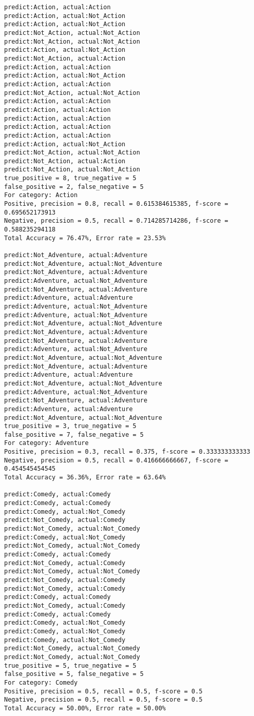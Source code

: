 \documentclass{article}
\begin{document}
\begin{lstlisting}
predict:Action, actual:Action
predict:Action, actual:Not_Action
predict:Action, actual:Not_Action
predict:Not_Action, actual:Not_Action
predict:Not_Action, actual:Not_Action
predict:Action, actual:Not_Action
predict:Not_Action, actual:Action
predict:Action, actual:Action
predict:Action, actual:Not_Action
predict:Action, actual:Action
predict:Not_Action, actual:Not_Action
predict:Action, actual:Action
predict:Action, actual:Action
predict:Action, actual:Action
predict:Action, actual:Action
predict:Action, actual:Action
predict:Action, actual:Not_Action
predict:Not_Action, actual:Not_Action
predict:Not_Action, actual:Action
predict:Not_Action, actual:Not_Action
true_positive = 8, true_negative = 5
false_positive = 2, false_negative = 5
For category: Action
Positive, precision = 0.8, recall = 0.615384615385, f-score = 0.695652173913 
Negative, precision = 0.5, recall = 0.714285714286, f-score = 0.588235294118 
Total Accuracy = 76.47%, Error rate = 23.53%

predict:Not_Adventure, actual:Adventure
predict:Not_Adventure, actual:Not_Adventure
predict:Not_Adventure, actual:Adventure
predict:Adventure, actual:Not_Adventure
predict:Not_Adventure, actual:Adventure
predict:Adventure, actual:Adventure
predict:Adventure, actual:Not_Adventure
predict:Adventure, actual:Not_Adventure
predict:Not_Adventure, actual:Not_Adventure
predict:Not_Adventure, actual:Adventure
predict:Not_Adventure, actual:Adventure
predict:Adventure, actual:Not_Adventure
predict:Not_Adventure, actual:Not_Adventure
predict:Not_Adventure, actual:Adventure
predict:Adventure, actual:Adventure
predict:Not_Adventure, actual:Not_Adventure
predict:Adventure, actual:Not_Adventure
predict:Not_Adventure, actual:Adventure
predict:Adventure, actual:Adventure
predict:Not_Adventure, actual:Not_Adventure
true_positive = 3, true_negative = 5
false_positive = 7, false_negative = 5
For category: Adventure
Positive, precision = 0.3, recall = 0.375, f-score = 0.333333333333 
Negative, precision = 0.5, recall = 0.416666666667, f-score = 0.454545454545 
Total Accuracy = 36.36%, Error rate = 63.64%

predict:Comedy, actual:Comedy
predict:Comedy, actual:Comedy
predict:Comedy, actual:Not_Comedy
predict:Not_Comedy, actual:Comedy
predict:Not_Comedy, actual:Not_Comedy
predict:Comedy, actual:Not_Comedy
predict:Not_Comedy, actual:Not_Comedy
predict:Comedy, actual:Comedy
predict:Not_Comedy, actual:Comedy
predict:Not_Comedy, actual:Not_Comedy
predict:Not_Comedy, actual:Comedy
predict:Not_Comedy, actual:Comedy
predict:Comedy, actual:Comedy
predict:Not_Comedy, actual:Comedy
predict:Comedy, actual:Comedy
predict:Comedy, actual:Not_Comedy
predict:Comedy, actual:Not_Comedy
predict:Comedy, actual:Not_Comedy
predict:Not_Comedy, actual:Not_Comedy
predict:Not_Comedy, actual:Not_Comedy
true_positive = 5, true_negative = 5
false_positive = 5, false_negative = 5
For category: Comedy
Positive, precision = 0.5, recall = 0.5, f-score = 0.5 
Negative, precision = 0.5, recall = 0.5, f-score = 0.5 
Total Accuracy = 50.00%, Error rate = 50.00%


\end{lstlisting}
\end{document}
